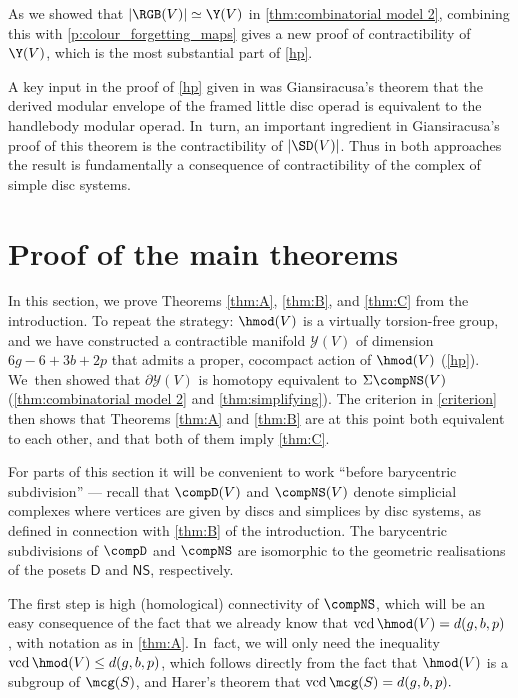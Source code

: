 \begin{rem} \label{rem:alternative_contractibility_proof} As we showed that $|\RGB(V)| \simeq \Y(V)$ in \cref{thm:combinatorial model 2}, combining this with \cref{p:colour_forgetting_maps} gives a new proof of contractibility of $\Y(V)$, which is the most substantial part of \cref{hp}.

A key input in the proof of \cref{hp} given in \cite{hainautpetersen} was Giansiracusa's theorem \cite{giansiracusa} that the derived modular envelope of the framed little disc operad is equivalent to the handlebody modular operad. In~turn, an important ingredient in Giansiracusa's proof of this theorem is the contractibility of $|\SD(V)|$. Thus in both approaches the result is fundamentally a consequence of contractibility of the complex of simple disc systems. \end{rem}

\section{Proof of the main theorems}

In this section, we prove Theorems \ref{thm:A}, \ref{thm:B}, and \ref{thm:C} from the introduction. To repeat the strategy: $\hmod(V)$ is a virtually torsion-free group, and we have constructed a contractible manifold $\mathcal{Y}(V)$ of dimension $6g-6+3b+2p$ that admits a proper, cocompact action of $\hmod(V)$ (\cref{hp}). We~then showed that $\partial \mathcal{Y}(V)$ is homotopy equivalent to $\Sigma \compNS(V)$ (\cref{thm:combinatorial model 2} and \cref{thm:simplifying}). The criterion in \cref{criterion} then shows that Theorems \ref{thm:A} and \ref{thm:B} are at this point both equivalent to each other, and that both of them imply \cref{thm:C}.

For parts of this section it will be convenient to work ``before barycentric subdivision'' --- recall that $\compD(V)$ and $\compNS(V)$ denote simplicial complexes where vertices are given by discs and simplices by disc systems, as defined in connection with \cref{thm:B} of the introduction. The barycentric subdivisions of $\compD$ and $\compNS$ are isomorphic to the geometric realisations of the posets $\mathsf D$ and $\mathsf{NS}$, respectively.

The first step is high (homological) connectivity of $\compNS$, which will be an easy consequence of the fact that we already know that $\operatorname{vcd}\hmod(V) =d(g,b,p)$ \cite{hirose}, with notation as in \cref{thm:A}. In~fact, we will only need the inequality $\operatorname{vcd} \hmod(V)\leq d(g,b,p)$, which follows directly from the fact that $\hmod(V)$ is a subgroup of $\mcg(S)$, and Harer's theorem \cite{harer} that $\operatorname{vcd} \mcg(S)=d(g,b,p).$


